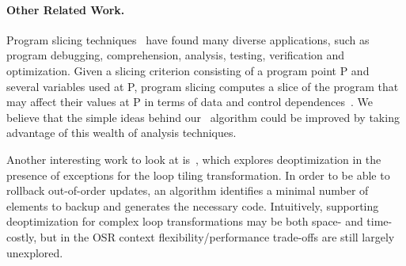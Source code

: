 \paragraph*{Other Related Work.} Program slicing techniques~\cite{Weiser82,Weiser84, Korel88, Agrawal90} have found many diverse applications, such as program debugging, comprehension, analysis, testing, verification and optimization. Given a slicing criterion consisting of a program point P and several variables used at P, program slicing computes a slice of the program that may affect their values at P in terms of data and control dependences~\cite{Tan16}. We believe that the simple ideas behind our \buildcomp\ algorithm could be improved by taking advantage of this wealth of analysis techniques.

Another interesting work to look at is~\cite{Bhandari15}, which explores deoptimization in the presence of exceptions for the loop tiling transformation. In order to be able to rollback out-of-order updates, an algorithm identifies a minimal number of elements to backup and generates the necessary code. Intuitively, supporting deoptimization for complex loop transformations may be both space- and time- costly, but in the OSR context flexibility/performance trade-offs are still largely unexplored.